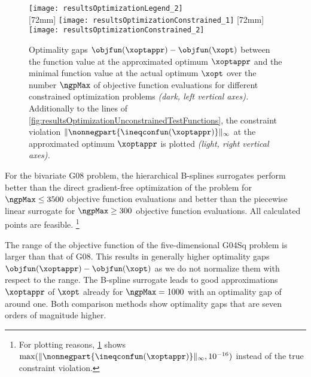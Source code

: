 \begin{figure}
  \texttt{[image: resultsOptimizationLegend\_2]}\\[2mm]%
  [72mm]{%
    \texttt{[image: resultsOptimizationConstrained\_1]}%
  }%
  \hfill%
  [72mm]{%
    \texttt{[image: resultsOptimizationConstrained\_2]}%
  }%
  \caption[Optimality gaps for different objective functions (constrained)]{%
    Optimality gaps $\objfun(\xoptappr) - \objfun(\xopt)$ between
    the function value at the approximated optimum $\xoptappr$ and
    the minimal function value at the actual optimum $\xopt$
    over the number $\ngpMax$ of objective function evaluations
    for different constrained optimization problems
    \emph{(dark, left vertical axes).}
    Additionally to the lines of
    \cref{fig:resultsOptimizationUnconstrainedTestFunctions},
    the constraint violation
    $\norm[\infty]{\nonnegpart{\ineqconfun(\xoptappr)}}$
    at the approximated optimum $\xoptappr$ is plotted
    \emph{(light, right vertical axes).}%
  }%
  \label{fig:resultsOptimizationConstrainedTestFunctions}%
\end{figure}

For the bivariate G08 problem, the hierarchical B-splines surrogates
perform better than the direct gradient-free optimization of the problem
for $\ngpMax \le 3500$ objective function evaluations
and better than the piecewise linear surrogate for $\ngpMax \ge 300$
objective function evaluations.
All calculated points are feasible.%
\footnote{%
  For plotting reasons,
  \cref{fig:resultsOptimizationConstrainedTestFunctions} shows
  $\max(\norm[\infty]{\nonnegpart{\ineqconfun(\xoptappr)}}, 10^{-16})$
  instead of the true constraint violation.%
}

The range of the objective function of the five-dimensional G04Sq problem
is larger than that of G08.
This results in generally higher optimality gaps
$\objfun(\xoptappr) - \objfun(\xopt)$ as we do not normalize them
with respect to the range.
The B-spline surrogate leads to good approximations $\xoptappr$
of $\xopt$ already for $\ngpMax = 1000$ with an optimality gap of
around one.
Both comparison methods show optimality gaps that are
seven orders of magnitude higher.

